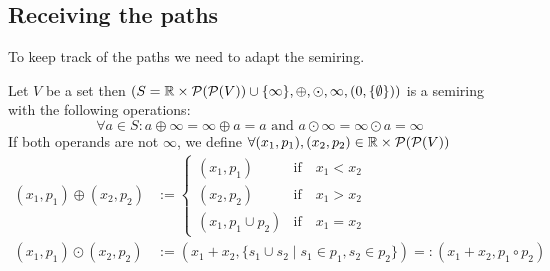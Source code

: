 \subsection{Receiving the paths}
To keep track of the paths we need to adapt the semiring. 
\begin{lemma}
    Let $V$ be a set then $(S = \mathbb{R} \times \mathcal{P}(\mathcal{P}(V)) \cup \{\infty\}, \oplus, \odot, \infty, (0, \{\emptyset\}))$ is a semiring with the following operations:
    $$\forall a \in S\colon a \oplus \infty = \infty \oplus a = a \textrm{ and } a \odot \infty = \infty \odot a = \infty$$
    If both operands are not $\infty$, we define $\forall (x_1, p_1), (x_2, p_2) \in \mathbb{R} \times \mathcal{P}(\mathcal{P}(V))$
    \begin{align*}
        (x_1, p_1) \oplus (x_2, p_2) &:= \begin{cases}
            (x_1, p_1) &\textrm{if}\quad x_1 < x_2 \\
            (x_2, p_2) &\textrm{if}\quad x_1 > x_2\\
            (x_1, p_1 \cup p_2) &\textrm{if}\quad x_1 = x_2
        \end{cases}\\
        (x_1, p_1) \odot (x_2, p_2) &:= (x_1 + x_2, \{s_1 \cup s_2 \mid s_1 \in p_1, s_2 \in p_2\}) =: (x_1 + x_2, p_1 \circ p_2)
    \end{align*}
\end{lemma}
